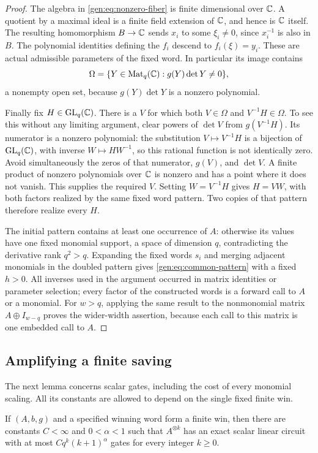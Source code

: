 \begin{proof}
The algebra in \cref{gen:eq:nonzero-fiber} is finite dimensional over
$\mathbb C$.  A quotient by a maximal ideal is a finite field extension of
$\mathbb C$, and hence is $\mathbb C$ itself.  The resulting homomorphism
$B\to\mathbb C$ sends $x_i$ to some $\xi_i\ne0$, since $x_i^{-1}$ is also in
$B$.  The polynomial identities defining the $f_i$ descend to
$f_i(\xi)=y_i$.  These are actual admissible parameters of the fixed
word.  In particular its image contains
\[
\Omega=\{Y\in\operatorname{Mat}_q(\mathbb C):g(Y)\det Y\ne0\},
\]
a nonempty open set, because $g(Y)\det Y$ is a nonzero polynomial.

Finally fix $H\in\operatorname{GL}_q(\mathbb C)$.  There is a $V$ for which both
$V\in\Omega$ and $V^{-1}H\in\Omega$.  To see this without any limiting
argument, clear powers of $\det V$ from $g(V^{-1}H)$.  Its numerator is
a nonzero polynomial: the substitution $V\mapsto V^{-1}H$ is a
bijection of $\operatorname{GL}_q(\mathbb C)$, with inverse $W\mapsto HW^{-1}$, so this
rational function is not identically zero.  Avoid simultaneously the
zeros of that numerator, $g(V)$, and $\det V$.  A finite product of
nonzero polynomials over $\mathbb C$ is nonzero and has a point where it does
not vanish.  This supplies the required $V$.  Setting $W=V^{-1}H$
gives $H=VW$, with both factors realized by the same fixed word
pattern.  Two copies of that pattern therefore realize every $H$.

The initial pattern contains at least one occurrence of $A$: otherwise
its values have one fixed monomial support, a space of dimension $q$,
contradicting the derivative rank $q^2>q$.  Expanding the fixed words
$s_i$ and merging adjacent monomials in the doubled pattern gives
\cref{gen:eq:common-pattern} with a fixed $h>0$.  All inverses used in
the argument occurred in matrix identities or parameter selection;
every factor of the constructed words is a forward call to $A$ or a
monomial.  For $w>q$, applying the same result to the nonmonomial matrix
$A\oplus I_{w-q}$ proves the wider-width assertion, because each call
to this matrix is one embedded call to $A$.
\end{proof}

\subsection{Amplifying a finite saving}

The next lemma concerns scalar gates, including the cost of every
monomial scaling.  All its constants are allowed to depend on the
single fixed finite win.

\begin{lemma}\label{lem:amplification}
If $(A,b,g)$ and a specified winning word form a finite win, then there
are constants $C<\infty$ and $0<\alpha<1$ such that $A^{\otimes k}$ has
an exact scalar linear circuit with at most
$Cq^k(k+1)^\alpha$ gates for every integer $k\geq0$.
\end{lemma}

